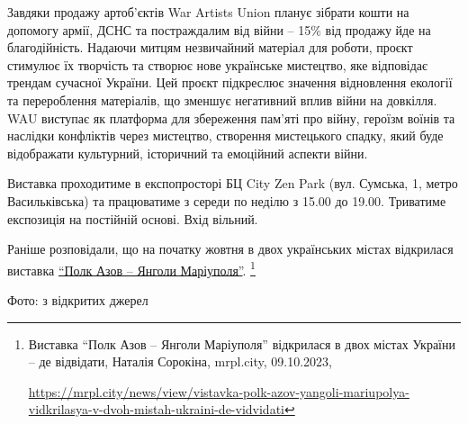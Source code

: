 Завдяки продажу артоб'єктів War Artists Union планує зібрати кошти на допомогу
армії, ДСНС та постраждалим від війни – 15\% від продажу йде на благодійність.
Надаючи митцям незвичайний матеріал для роботи, проєкт стимулює їх творчість та
створює нове українське мистецтво, яке відповідає трендам сучасної України. Цей
проєкт підкреслює значення відновлення екології та перероблення матеріалів, що
зменшує негативний вплив війни на довкілля. WAU виступає як платформа для
збереження пам'яті про війну, героїзм воїнів та наслідки конфліктів через
мистецтво, створення мистецького спадку, який буде відображати культурний,
історичний та емоційний аспекти війни.

Виставка проходитиме в експопросторі БЦ City Zen Park (вул. Сумська, 1, метро
Васильківська) та працюватиме з середи по неділю з 15.00 до 19.00. Триватиме
експозиція на постійній основі. Вхід вільний.

Раніше розповідали, що на початку жовтня в двох українських містах відкрилася
виставка \href{https://mrpl.city/news/view/vistavka-polk-azov-yangoli-mariupolya-vidkrilasya-v-dvoh-mistah-ukraini-de-vidvidati}{%
\enquote{Полк Азов – Янголи Маріуполя}}.%
\footnote{Виставка \enquote{Полк Азов – Янголи Маріуполя} відкрилася в двох містах України – де відвідати, Наталія Сорокіна, %
mrpl.city, 09.10.2023, \par%
\url{https://mrpl.city/news/view/vistavka-polk-azov-yangoli-mariupolya-vidkrilasya-v-dvoh-mistah-ukraini-de-vidvidati}}

Фото: з відкритих джерел
